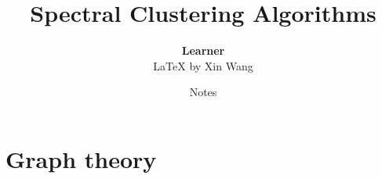 \documentclass[oneside]{book}
\def\notetitle{Spectral Clustering Algorithms}
\def\noteauthor{
    \textbf{Learner}\\
    {\LaTeX} by Xin Wang\\
}
\def\notedate{Notes}
\begin{document}
\title{
    \textbf{
        \LARGE{\notetitle} \vspace*{10\baselineskip}
    }
}
\author{\noteauthor}
\date{\notedate}

\maketitle
\newpage

\tableofcontents  %
\listoffigures    %
\listoftables     %
\newpage


\chapter{Graph theory}
\end{document}

